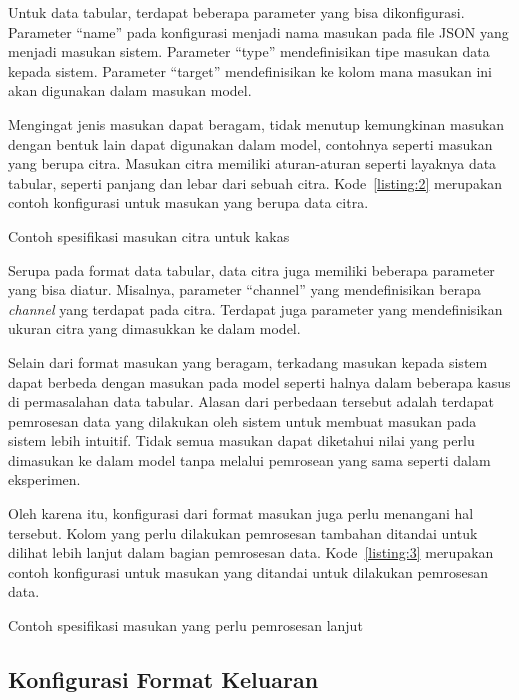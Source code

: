 Untuk data tabular, terdapat beberapa parameter yang bisa dikonfigurasi.
Parameter ``name'' pada konfigurasi menjadi nama masukan pada file JSON yang menjadi masukan sistem.
Parameter ``type'' mendefinisikan tipe masukan data kepada sistem.
Parameter ``target'' mendefinisikan ke kolom mana masukan ini akan digunakan dalam masukan model.

Mengingat jenis masukan dapat beragam, tidak menutup kemungkinan masukan dengan bentuk lain dapat digunakan dalam model, contohnya seperti masukan yang berupa citra.
Masukan citra memiliki aturan-aturan seperti layaknya data tabular, seperti panjang dan lebar dari sebuah citra.
Kode~\ref{listing:2} merupakan contoh konfigurasi untuk masukan yang berupa data citra.

\begin{code}
	\caption{Contoh spesifikasi masukan citra untuk kakas}\label{listing:2}
\end{code}

Serupa pada format data tabular, data citra juga memiliki beberapa parameter yang bisa diatur.
Misalnya, parameter ``channel'' yang mendefinisikan berapa \textit{channel} yang terdapat pada citra.
Terdapat juga parameter yang mendefinisikan ukuran citra yang dimasukkan ke dalam model.

Selain dari format masukan yang beragam, terkadang masukan kepada sistem dapat berbeda dengan masukan pada model seperti halnya dalam beberapa kasus di permasalahan data tabular.
Alasan dari perbedaan tersebut adalah terdapat pemrosesan data yang dilakukan oleh sistem untuk membuat masukan pada sistem lebih intuitif.
Tidak semua masukan dapat diketahui nilai yang perlu dimasukan ke dalam model tanpa melalui pemrosean yang sama seperti dalam eksperimen.

Oleh karena itu, konfigurasi dari format masukan juga perlu menangani hal tersebut.
Kolom yang perlu dilakukan pemrosesan tambahan ditandai untuk dilihat lebih lanjut dalam bagian pemrosesan data.
Kode~\ref{listing:3} merupakan contoh konfigurasi untuk masukan yang ditandai untuk dilakukan pemrosesan data.

\begin{code}
	\caption{Contoh spesifikasi masukan yang perlu pemrosesan lanjut}\label{listing:3}
\end{code}

\subsection{Konfigurasi Format Keluaran}\label{section:03-output-format}

